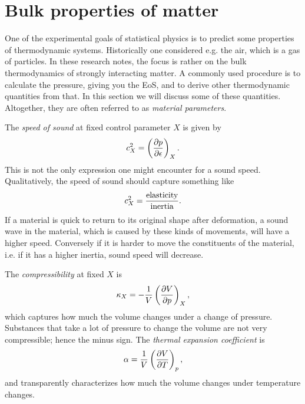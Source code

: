 \section{Bulk properties of matter}

One of the experimental goals of statistical physics is to predict some
properties of thermodynamic systems. Historically one considered e.g.
the air, which is a gas of particles. In these research notes, the focus
is rather on the bulk thermodynamics of strongly interacting matter.
A commonly used procedure is to calculate the pressure, giving
you the EoS, and to derive other thermodynamic quantities from that.
In this section we will discuss some of these quantities.
Altogether, they are often referred to as {\it material
parameters}.

The {\it speed of sound} at fixed control parameter $X$
is given by
\begin{equation}
  c_X^2=\left(\pdv{p}{\epsilon}\right)_{X}.
\end{equation}
This is not the only expression one might encounter for a sound speed.
Qualitatively, the speed of sound should capture something like
\begin{equation}
  c_X^2=\frac{{\rm elasticity}}{{\rm inertia}}.
\end{equation}
If a material is quick to return to its original shape after deformation, a sound
wave in the material, which is caused by these kinds of movements, will have a
higher speed. Conversely if it is harder to move the constituents of the
material, i.e. if it has a higher inertia, sound speed will decrease.


The {\it compressibility} at fixed $X$ is
\begin{equation}
  \kappa_X=-\frac{1}{V}\left(\pdv{V}{p}\right)_{X},
\end{equation}
which captures how much the volume changes under a change of pressure.
Substances that take a lot of pressure to change the volume are not
very compressible; hence the minus sign.
The {\it thermal expansion coefficient}
is
\begin{equation}
  \alpha=\frac{1}{V}\left(\pdv{V}{T}\right)_{p},
\end{equation}
and transparently characterizes how much the volume changes under temperature
changes.

